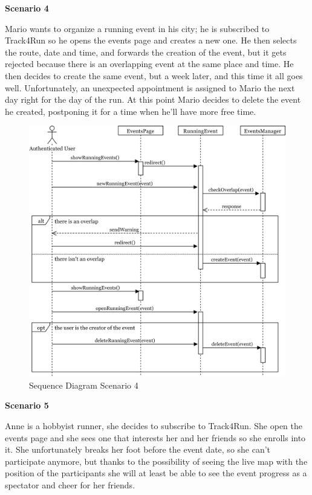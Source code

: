 \documentclass[../main.tex]{subfiles}
\begin{document}
		\begin{minipage}{\textwidth}
			{\bf Scenario 4}
			\vspace{3mm}

			Mario wants to organize a running event in his city; he is subscribed to Track4Run so he opens the events page and creates a new one. He then selects the route, date and time, and forwards the creation of the event, but it gets rejected because there is an overlapping event at the same place and time. He then decides to create the same event, but a week later, and this time it all goes well. Unfortunately, an unexpected appointment is assigned to Mario the next day right for the day of the run. At this point Mario decides to delete the event he created, postponing it for a time when he'll have more free time.
			\vspace{5mm}
		\end{minipage}
		\begin{figure}[H]
			\centering
			\includegraphics[scale=.07]{images/sequenceDiagram4.png}
			\caption{Sequence Diagram Scenario 4 \label{fig:Sequence Diagram Scenario 4}}
		\end{figure}
		\begin{minipage}{\textwidth}

		\end{minipage}
		\begin{minipage}{\textwidth}
			{\bf Scenario 5}
			\vspace{3mm}

			Anne is a hobbyist runner, she decides to subscribe to Track4Run. She open the events page and she sees one that interests her and her friends so she enrolls into it. She unfortunately breaks her foot before the event date, so she can't participate anymore, but thanks to the possibility of seeing the live map with the position of the participants she will at least be able to see the event progress as a spectator and cheer for her friends.
			\vspace{5mm}
		\end{minipage}
\end{document}
